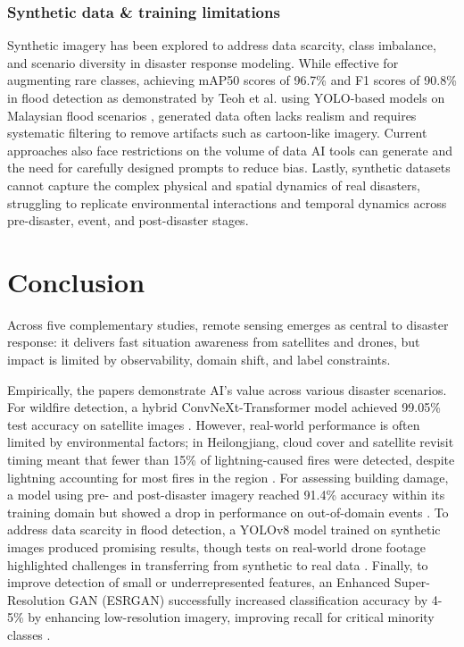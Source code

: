 \documentclass[conference,a4paper]{IEEEtran}
\begin{document}
\subsubsection{Synthetic data \& training limitations}
Synthetic imagery has been explored to address data scarcity, class imbalance, and scenario diversity in disaster response modeling. While effective for augmenting rare classes, achieving mAP50 scores of 96.7\% and F1 scores of 90.8\% in flood detection as demonstrated by Teoh et al. using YOLO-based models on Malaysian flood scenarios \cite{teohExploringGenerativeAI2024}, generated data often lacks realism and requires systematic filtering to remove artifacts such as cartoon-like imagery. Current approaches also face restrictions on the volume of data AI tools can generate and the need for carefully designed prompts to reduce bias. Lastly, synthetic datasets cannot capture the complex physical and spatial dynamics of real disasters, struggling to replicate environmental interactions and temporal dynamics across pre-disaster, event, and post-disaster stages.

\section{Conclusion}
Across five complementary studies, remote sensing emerges as central to disaster response: it delivers fast situation awareness from satellites and drones, but impact is limited by observability, domain shift, and label constraints.

Empirically, the papers demonstrate AI's value across various disaster scenarios. For wildfire detection, a hybrid ConvNeXt-Transformer model achieved 99.05\% test accuracy on satellite images \cite{elbohy2025fusion}. However, real-world performance is often limited by environmental factors; in Heilongjiang, cloud cover and satellite revisit timing meant that fewer than 15\% of lightning-caused fires were detected, despite lightning accounting for most fires in the region \cite{jiaoForestFirePatterns2023}. For assessing building damage, a model using pre- and post-disaster imagery reached 91.4\% accuracy within its training domain but showed a drop in performance on out-of-domain events \cite{kimDisasterAssessmentUsing2022}. To address data scarcity in flood detection, a YOLOv8 model trained on synthetic images produced promising results, though tests on real-world drone footage highlighted challenges in transferring from synthetic to real data \cite{teohExploringGenerativeAI2024}. Finally, to improve detection of small or underrepresented features, an Enhanced Super-Resolution GAN (ESRGAN) successfully increased classification accuracy by 4-5\% by enhancing low-resolution imagery, improving recall for critical minority classes \cite{lagapEnhancingPostDisasterDamage2025}.
\end{document}
